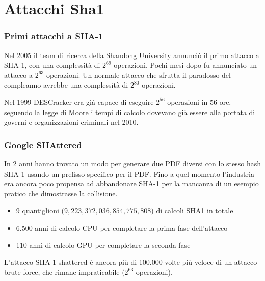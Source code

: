 \section{Attacchi Sha1}

\begin{frame}
\frametitle{Primi attacchi a SHA-1}
Nel 2005 il team di ricerca della Shandong University annunciò il primo attacco a SHA-1, con una complessità di \(2^{69}\) operazioni. Pochi mesi dopo fu annunciato un attacco a \(2^{63}\) operazioni.
Un normale attacco che sfrutta il paradosso del compleanno avrebbe una complessità di \(2^{80}\) operazioni.

\vspace{1cm}

Nel 1999 DESCracker era già capace di eseguire \(2^{56}\) operazioni in 56 ore, seguendo la legge di Moore i tempi di calcolo dovevano già essere alla portata di governi e organizzazioni criminali nel 2010.
\end{frame}


\begin{frame}
\frametitle{Google SHAttered}

In 2 anni hanno trovato un modo per generare due PDF diversi con lo stesso hash SHA-1 usando un prefisso specifico per il PDF.
Fino a quel momento l'industria era ancora poco propensa ad abbandonare SHA-1 per la mancanza di un esempio pratico che dimostrasse la collisione.
\begin{itemize}
    \item 9 quantiglioni (\(9,223,372,036,854,775,808\)) di calcoli SHA1 in totale
    \item 6.500 anni di calcolo CPU per completare la prima fase dell'attacco
    \item 110 anni di calcolo GPU per completare la seconda fase 
\end{itemize}

L'attacco SHA-1 shattered è ancora più di 100.000 volte più veloce di un attacco brute force, che rimane impraticabile (\(2^{63}\) operazioni).
\end{frame}

